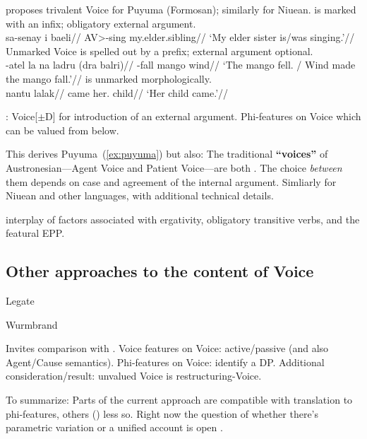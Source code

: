 \pex\label{ex:puyuma}\cite{nie17} proposes trivalent Voice for Puyuma (Formosan); similarly for Niuean.
	\a {\vd} is marked with an infix; obligatory external argument.\\
		\begingl
		\gla sa-senay i baeli//
		\glb {<}AV>-sing  my.elder.sibling//
		\glft `My elder sister is/was singing.'//
	\endgl
	\a Unmarked Voice is spelled out by a prefix; external argument optional.\\
		\begingl
		\gla {}-atel la na ladru (dra balri)//
		\glb {}-fall   mango  wind//
		\glft `The mango fell. / Wind made the mango fall.'//
	\endgl
	\a {\vz} is unmarked morphologically.\\
		\begingl
		\gla {} nantu lalak//
		\glb came her. child//
		\glft `Her child came.'//
	\endgl
\xe


\pex \cite{nie17}:
	\a Voice{[}$\pm$D] for introduction of an external argument.
	\a Phi-features on Voice which can be valued from below.
\xe

\pex This derives Puyuma~(\ref{ex:puyuma}) but also:
	\a The traditional \textbf{``voices''} of Austronesian---Agent Voice and Patient Voice---are both {\vd}. The choice \emph{between} them depends on case and agreement of the internal argument.
	\a Simliarly for Niuean and other languages, with additional technical details.
\xe


\cite{schaefer17oup}

interplay of factors associated with ergativity, obligatory transitive verbs, and the featural EPP.

	\subsection{Other approaches to the content of Voice} \label{i:agree:other}
Legate

Wurmbrand

\pex Invites comparison with \cite{wurmbrandshimamura17}.
	\a Voice features on Voice: active/passive (and also Agent/Cause semantics). %
	\a Phi-features on Voice: identify a DP.
	\a Additional consideration/result: unvalued Voice is restructuring-Voice.
\xe

\pex To summarize:
	\a Parts of the current approach are compatible with translation to phi-features, others (\vz) less so.
	\a Right now the question of whether there's parametric variation or a unified account is open \citep[191ff12]{wurmbrandshimamura17}.
\xe

